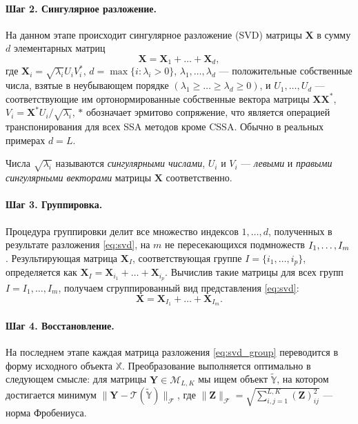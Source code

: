 \documentclass[specialist,
               substylefile = spbu.rtx,
               subf,href,colorlinks=true, 12pt]{disser}
\begin{document}
\paragraph{Шаг 2. Сингулярное разложение.}
На данном этапе происходит сингулярное разложение (SVD) матрицы $\mathbf{X}$ в сумму $d$ элементарных матриц
\begin{equation} \label{eq:svd}
    \mathbf{X}=\mathbf{X}_1+\ldots+\mathbf{X}_d,
\end{equation}
где
$\mathbf{X}_i=\sqrt{\lambda_i}U_i V_i^\mathrm{*}$, $d=\max\{i : \lambda_i > 0\}$,
$\lambda_1,\ldots,\lambda_d$ --- положительные собственные числа, взятые в неубывающем порядке $(\lambda_1\geqslant\ldots\geqslant\lambda_d\geqslant 0)$, и $U_1,\ldots,U_d$ --- соответствующие им ортонормированные собственные вектора матрицы  $\mathbf{X}\mathbf{X}^\mathrm{*}$, $V_i=\mathbf{X}^\mathrm{*} U_i/\sqrt{\lambda_i}$, $\mathrm{*}$ обозначает эрмитово сопряжение, что является операцией транспонирования для всех SSA методов кроме CSSA. 
Обычно в реальных примерах $d=L$.

Числа $\sqrt{\lambda_i}$ называются \emph{сингулярными числами}, $U_i$  и $V_i$ --- \emph{левыми} и \emph{правыми сингулярными векторами} матрицы  $\mathbf{X}$ соответственно.

\paragraph{Шаг 3. Группировка.}  Процедура группировки делит все множество индексов ${1,\ldots,d}$, полученных в результате разложения \eqref{eq:svd}, на $m$ не пересекающихся подмножеств $I_1,\ldots,\\ I_m$.
Результирующая матрица $\mathbf{X}_I$, соответствующая группе $I=\{i_1,\ldots,i_p\}$, определяется как $\mathbf{X}_I=\mathbf{X}_{i_1}+\ldots+\mathbf{X}_{i_p}$.
Вычислив такие матрицы для всех групп $I=I_1,\ldots,I_m$, получаем сгруппированный вид представления \eqref{eq:svd}:
\begin{equation}\label{eq:svd_group}
    \mathbf{X}=\mathbf{X}_{I_1}+\ldots+\mathbf{X}_{I_m}.
\end{equation}

\paragraph{Шаг 4. Восстановление.}
На последнем этапе каждая матрица разложения \eqref{eq:svd_group} переводится в форму исходного объекта $\mathbb{X}$. Преобразование выполняется оптимально в следующем смысле: для матрицы $\mathbf{Y} \in \mathcal{M}_{L,K}$ мы ищем объект $\widetilde{\mathbb{Y}}$, на котором достигается минимум $\|\mathbf{Y} -  \mathcal{T}(\widetilde{\mathbb{Y}})\|_{\mathcal{F}}$, где $\|\mathbf{Z}\|_{\mathcal{F}} = \sqrt{\sum_{i,j=1}^{L,K}(\mathbf{Z})_{ij}^2}$ --- норма Фробениуса.
\end{document}
